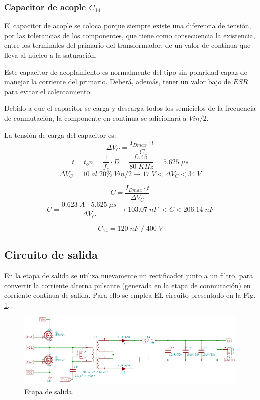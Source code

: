 \documentclass[11pt, a4paper]{article}
\begin{document}
\subsubsection{Capacitor de acople $C_{14}$}
El capacitor de acople se coloca porque siempre existe una diferencia de tensión, por las tolerancias de los componentes, que tiene como consecuencia la existencia, entre los terminales del primario del transformador, de un valor de continua que lleva al núcleo a la saturación. 

Este capacitor de acoplamiento es normalmente del tipo sin polaridad capaz de manejar la corriente del primario. Deberá, además, tener un valor bajo de $ESR$ para evitar el calentamiento.

Debido a que el capacitor se carga y descarga todos los semiciclos de la frecuencia de conmutación, la componente en continua se adicionará a $Vin / 2$.

La tensión de carga del capacitor es:
\begin{equation}
\Delta V_C = \frac{I_{Dmax} \cdot t}{C}
\label{VC}
\end{equation}
\[ t = t_on = \frac{1}{f_c} \cdot D = \frac{0.45}{80 \; KHz} = 5.625 \; \mu s \]
\[ \Delta V_C = 10 \; al \; 20 \% \; Vin / 2 \rightarrow 17 \; V < \Delta V_C < 34 \; V \]

\begin{equation}
C =  \frac{I_{Dmax} \cdot t}{\Delta V_C}
\label{C}
\end{equation}
\[ C =  \frac{0.623 \; A \; \cdot 5.625 \; \mu s}{\Delta V_C} \rightarrow 103.07 \; nF \; < C < 206.14 \; nF \]

\[ C_{14} = 120 \; nF \; / \; 400 \; V \]

\subsection{Circuito de salida}
En la etapa de salida se utiliza nuevamente un rectificador junto a un
filtro, para convertir la corriente alterna pulsante (generada en la etapa de conmutación) en corriente continua de salida. Para ello se emplea EL circuito presentado en la Fig. \ref{salida}.

\begin{figure}[h]
	\centering
	\includegraphics[width = 12 cm]{Imagenes/trafo_salida}
	\caption{Etapa de salida.}
	\label{salida}
\end{figure}
\end{document}
